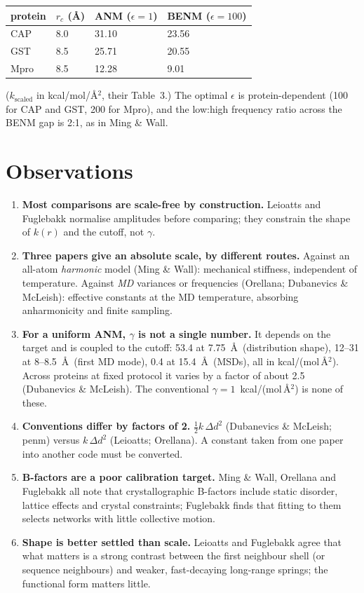 \documentclass[11pt]{article}
\begin{document}
\begin{center}
\small
\begin{tabular}{llll}
\toprule
protein & $r_c$ (\AA) & ANM ($\epsilon=1$) & BENM ($\epsilon=100$) \\
\midrule
CAP  & 8.0 & 31.10 & 23.56 \\
GST  & 8.5 & 25.71 & 20.55 \\
Mpro & 8.5 & 12.28 & 9.01 \\
\bottomrule
\end{tabular}
\end{center}
($k_{\mathrm{scaled}}$ in kcal/mol/\AA$^2$, their Table~3.)
The optimal $\epsilon$ is protein-dependent (100 for CAP and GST, 200 for Mpro), and the
low:high frequency ratio across the BENM gap is 2:1, as in Ming \& Wall.

\section{Observations}

\begin{enumerate}
\item \textbf{Most comparisons are scale-free by construction.}
Leioatts and Fuglebakk normalise amplitudes before comparing; they constrain the shape of
$k(r)$ and the cutoff, not $\gamma$.

\item \textbf{Three papers give an absolute scale, by different routes.}
Against an all-atom \emph{harmonic} model (Ming \& Wall): mechanical stiffness, independent
of temperature.
Against \emph{MD} variances or frequencies (Orellana; Dubanevics \& McLeish): effective
constants at the MD temperature, absorbing anharmonicity and finite sampling.

\item \textbf{For a uniform ANM, $\gamma$ is not a single number.}
It depends on the target and is coupled to the cutoff: 53.4 at 7.75~\AA\ (distribution
shape), 12--31 at 8--8.5~\AA\ (first MD mode), 0.4 at 15.4~\AA\ (MSDs), all in
kcal/(mol\,\AA$^2$).
Across proteins at fixed protocol it varies by a factor of about 2.5 (Dubanevics \&
McLeish).
The conventional $\gamma = 1$~kcal/(mol\,\AA$^2$) is none of these.

\item \textbf{Conventions differ by factors of 2.}
$\tfrac12 k\,\Delta d^2$ (Dubanevics \& McLeish; penm) versus $k\,\Delta d^2$ (Leioatts;
Orellana).
A constant taken from one paper into another code must be converted.

\item \textbf{B-factors are a poor calibration target.}
Ming \& Wall, Orellana and Fuglebakk all note that crystallographic B-factors include
static disorder, lattice effects and crystal constraints; Fuglebakk finds that fitting to
them selects networks with little collective motion.

\item \textbf{Shape is better settled than scale.}
Leioatts and Fuglebakk agree that what matters is a strong contrast between the first
neighbour shell (or sequence neighbours) and weaker, fast-decaying long-range springs; the
functional form matters little.
\end{enumerate}
\end{document}
